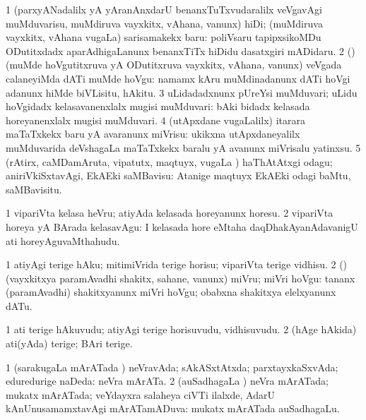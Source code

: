 \bentry
{}
\gl{\sakirx}
\bmng
\bnum
\num{1} (parxyANadalilx yA yAranAnxdarU benanxTuTxvudaralilx veVgavAgi muMduvarisu, muMdiruva vayxkitx, vAhana, \mo vanunx) hiDi; (muMdiruva vayxkitx, vAhana \mo vugaLa) sarisamakekx baru:  poliVsaru tapipxsikoMDu ODutitxdadx aparAdhigaLanunx benanxTiTx hiDidu dasatxgiri mADidaru. 
\num{2} (\birx) (muMde hoVgutitxruva yA ODutitxruva vayxkitx, vAhana, \mo vanunx) veVgada calaneyiMda dATi muMde hoVgu:  namamx kAru muMdinadanunx dATi hoVgi adanunx hiMde biVLisitu, hAkitu. 
\num{3} uLidadadxnunx pUreYsi muMduvari; uLidu hoVgidadx kelasavanenxlalx mugisi muMduvari:  bAki bidadx kelasada horeyanenxlalx mugisi muMduvari. 
\num{4} (utApxdane \mo vugaLalilx) itarara maTaTxkekx baru yA avaranunx miVrisu:  ukikxna utApxdaneyalilx muMduvarida deVshagaLa maTaTxkekx baralu yA avanunx miVrisalu yatinxsu. 
\num{5} (rAtirx, caMDamAruta, vipatutx, maqtuyx, \mo vugaLa \vi) haThAtAtxgi odagu; aniriVkiSxtavAgi, EkAEki saMBavisu:  Atanige maqtuyx EkAEki odagi baMtu, saMBavisitu. 
\enum
\emng
\eentry

\bentry
{}
\gl{\sakirx}
\bmng
\bnum
\num{1} vipariVta kelasa heVru; atiyAda kelasada horeyanunx horesu. 
\num{2} vipariVta horeya yA BArada kelasavAgu:  I kelasada hore eMtaha daqDhakAyanAdavanigU ati horeyAguvaMthahudu. 
\enum
\emng
\eentry

\bentry
{}
\gl{\sakirx}
\bmng
\bnum
\num{1} atiyAgi terige hAku; mitimiVrida terige horisu; vipariVta terige vidhisu. 
\num{2} (\rUpa) (vayxkitxya paramAvadhi shakitx, sahane, \mo vanunx) miVru; miVri hoVgu:  tananx (paramAvadhi) shakitxyanunx miVri hoVgu; obabxna shakitxya elelxyanunx dATu. 
\enum
\emng
\eentry

\bentry
{}
\gl{\nA}
\bmng
\bnum
\num{1} ati terige hAkuvudu; atiyAgi terige horisuvudu, vidhisuvudu. 
\num{2} (hAge hAkida) ati(yAda) terige; BAri terige. 
\enum
\emng
\eentry

\bentry
{}
\gl{\gu}
\bmng
\bnum
\num{1} (sarakugaLa mArATada \vi) neVravAda; sAkASxtAtxda; parxtayxkaSxvAda; eduredurige naDeda:  neVra mArATa. 
\num{2} (auSadhagaLa \vi) neVra mArATada; mukatx mArATada; veYdayxra salaheya ciVTi ilalxde, AdarU kAnUnusamamxtavAgi mArATamADuva:  mukatx mArATada auSadhagaLu. 
\enum
\emng
\eentry

